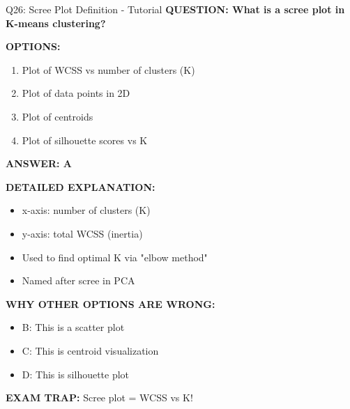 \documentclass[8pt]{beamer}
\begin{document}
	\begin{frame}{Q26: Scree Plot Definition - Tutorial}
		\fontsize{6.5}{7.5}\selectfont
		\textbf{QUESTION: What is a scree plot in K-means clustering?}
		
		\vspace{0.1cm}
		\textbf{OPTIONS:}
		\begin{enumerate}
			\item Plot of WCSS vs number of clusters (K)
			\item Plot of data points in 2D
			\item Plot of centroids
			\item Plot of silhouette scores vs K
		\end{enumerate}
		
		\vspace{0.1cm}
		\textcolor{myblue}{\textbf{ANSWER: A}}
		
		\vspace{0.1cm}
		\textbf{DETAILED EXPLANATION:}
		\begin{itemize}
			\item x-axis: number of clusters (K)
			\item y-axis: total WCSS (inertia)
			\item Used to find optimal K via "elbow method"
			\item Named after scree in PCA
		\end{itemize}
		
		\vspace{0.1cm}
		\textcolor{myred}{\textbf{WHY OTHER OPTIONS ARE WRONG:}}
		\begin{itemize}
			\item \textcolor{myred}{B:} This is a scatter plot
			\item \textcolor{myred}{C:} This is centroid visualization
			\item \textcolor{myred}{D:} This is silhouette plot
		\end{itemize}
		
		\textcolor{myred}{\textbf{EXAM TRAP:}} Scree plot = \textcolor{myblue}{WCSS vs K}!
	\end{frame}
	
\end{document}
